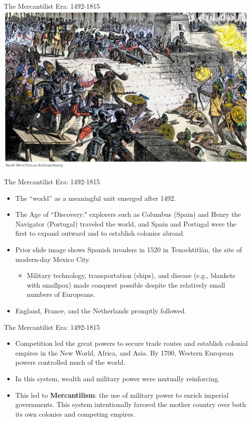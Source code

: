 \documentclass[handout]{beamer}
\begin{document}
\begin{frame}{\LARGE The Mercantilist Era: 1492-1815}
 \centering
\includegraphics[width=\textwidth,height=.9\textheight,keepaspectratio]{Conquistadors.jpg}	
\end{frame}

\begin{frame}{\LARGE The Mercantilist Era: 1492-1815}
	\begin{itemize}
		\item The ``world” as a meaningful unit emerged after 1492.
		\item The Age of ``Discovery:" explorers such as Columbus (Spain) and Henry the Navigator (Portugal) traveled the world, and Spain and Portugal were the first to expand outward and to establish colonies abroad. \pause
		\item Prior slide image shows Spanish invaders in 1520 in Tenochtitlán, the site of modern-day Mexico City.
		\begin{itemize}
			\item Military technology, transportation (ships), and disease (e.g., blankets with smallpox) made conquest possible despite the relatively small numbers of Europeans. \pause
		\end{itemize}
		\item England, France, and the Netherlands promptly followed. 
	\end{itemize}
\end{frame}

\begin{frame}{\LARGE The Mercantilist Era: 1492-1815}
	\begin{itemize}
		\item Competition led the great powers to secure trade routes and establish colonial empires in the New World, Africa, and Asia. By 1700, Western European powers controlled much of the world.
		\item In this system, wealth and military power were mutually reinforcing.
		\item This led to \textbf{Mercantilism}: the use of military power to enrich imperial governments. This system intentionally favored the mother country over both its own colonies and competing empires.
	\end{itemize}
\end{frame}
\end{document}
